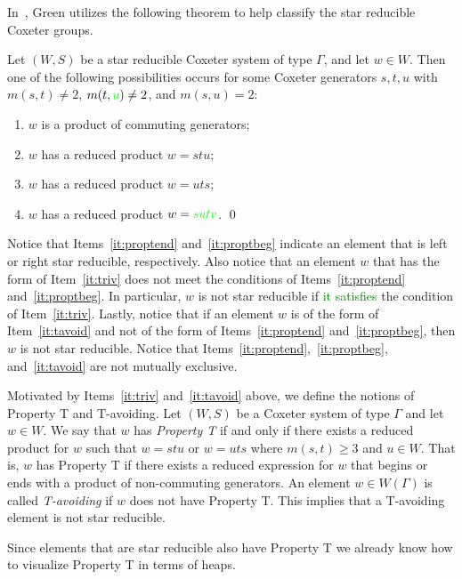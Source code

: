 In~\cite{Green2006a}, Green utilizes the following theorem to help classify the star reducible Coxeter groups. 
\begin{proposition}\label{thm:starred}
	Let $(W,S)$ be a star reducible Coxeter system of type $\Gamma$, and let $w \in W$. Then one of the following possibilities occurs for some Coxeter generators $s,t, u$ with $m(s,t) \neq 2$, $m(t,\textcolor{green}{u}) \neq 2$, and $m(s,u)=2$:
	\begin{enumerate}[leftmargin=2cm]
	\item $w$ is a product of commuting generators;\label{it:triv}
	\item $w$ has a reduced product $w=stu$;\label{it:proptend}
	\item $w$ has a reduced product $w=uts$;\label{it:proptbeg}
	\item $w$ has a reduced product $w=\textcolor{green}{sutv}$.\label{it:tavoid}	\qed
	\end{enumerate}
\end{proposition}

Notice that Items~\ref{it:proptend} and~\ref{it:proptbeg} indicate an element that is left or right star reducible, respectively. Also notice that an element $w$ that has the form of Item~\ref{it:triv} does not meet the conditions of Items~\ref{it:proptend} and~\ref{it:proptbeg}. In particular, $w$ is not star reducible if \textcolor{green}{it satisfies} the condition of Item~\ref{it:triv}. Lastly, notice that if an element $w$ is of the form of Item~\ref{it:tavoid} and not of the form of Items~\ref{it:proptend} and~\ref{it:proptbeg}, then $w$ is not star reducible. Notice that Items~\ref{it:proptend},~\ref{it:proptbeg}, and~\ref{it:tavoid} are not mutually exclusive.

Motivated by Items~\ref{it:triv} and~\ref{it:tavoid} above, we define the notions of Property T and T-avoiding. Let $(W,S)$ be a Coxeter system of type $\Gamma$ and let $w \in W$. We say that $w$ has \emph{Property T} if and only if there exists a reduced product for $w$ such that $w=stu$ or $w=uts$ where $m(s,t)\geq 3$ and $u \in W$. That is, $w$ has Property T if there exists a reduced expression for $w$ that begins or ends with a product of non-commuting generators. An element $w \in W(\Gamma)$ is called \emph{T-avoiding} if $w$ does not have Property T. This implies that a T-avoiding element is not star reducible.

 Since elements that are star reducible also have Property T we already know how to visualize Property T in terms of heaps.
 
